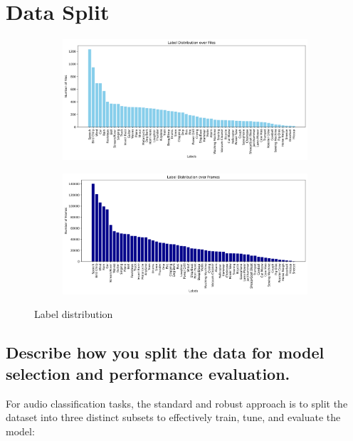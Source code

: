 
\section{Data Split} 
\label{sec:Data Split}


\begin{figure}[htbp]
  \centering
  \begin{subfigure}[b]{0.49\textwidth}
    \includegraphics[width=\textwidth]{figs/2_Label Distribution over Files.png}
  \end{subfigure}
  \hfill
  \begin{subfigure}[b]{0.49\textwidth}
    \includegraphics[width=\textwidth]{figs/2_Label Distribution over Frames.png}
  \end{subfigure}
  \caption{Label distribution}
  \label{fig:data-split}
\end{figure}



\subsection{Describe how you split the data for model selection and performance evaluation. }
\label{sec:Data Split:a}

For audio classification tasks, the standard and robust approach is to split the dataset into three distinct subsets to effectively train, tune, and evaluate the model:


